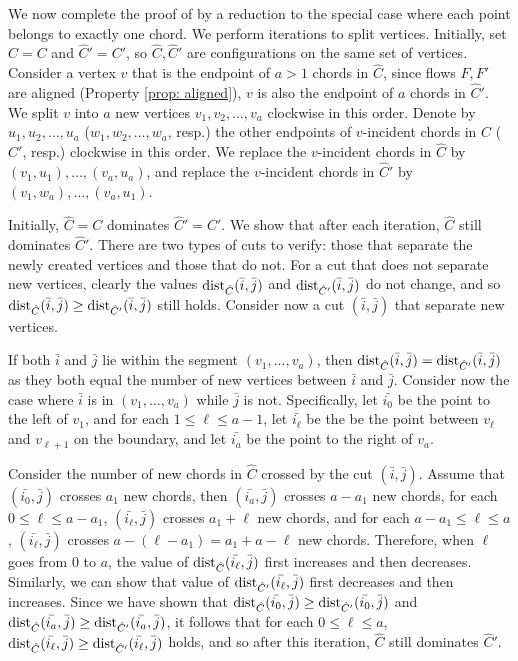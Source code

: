 \documentclass[11pt]{article}
\newcommand{\dist}{\textnormal{dist}}
\begin{document}
We now complete the proof of  by a reduction to the special case where each point belongs to exactly one chord. We perform iterations to split vertices.
Initially, set $\hat C=C$ and $\hat C'=C'$, so $\hat C, \hat C'$ are configurations on the same set of vertices.
Consider a vertex $v$ that is the endpoint of $a>1$ chords in $\hat C$, since flows $F,F'$ are aligned (Property \ref{prop: aligned}), $v$ is also the endpoint of $a$ chords in $\hat C'$.
We split $v$ into $a$ new vertices $v_1,v_2,\ldots, v_a$ clockwise in this order. 
Denote by $u_1,u_2,\ldots,u_a$ ($w_1,w_2,\ldots,w_a$, resp.) 
the other endpoints of $v$-incident chords in $\hat C$ ($\hat C'$, resp.) clockwise in this order. 
We replace the $v$-incident chords in $\hat C$ by $(v_1,u_1),\dots,(v_a,u_a)$, and replace the $v$-incident chords in $\hat C'$ by $(v_1,w_a),\dots,(v_a,u_1)$. 

Initially, $\hat C=C$ dominates $\hat C'=C'$.
We show that after each iteration, $\hat C$ still dominates $\hat C'$. 
There are two types of cuts to verify: those that separate the newly created vertices and those that do not.
For a cut that does not separate new vertices, clearly the values $\dist_{\hat C}(\bar i,\bar j)$ and $\dist_{\hat C'}(\bar i,\bar j)$ do not change, and so $\dist_{\hat C}(\bar i,\bar j)\ge \dist_{\hat C'}(\bar i,\bar j)$ still holds.
Consider now a cut $(\bar i,\bar j)$ that separate new vertices.

If both $\bar i$ and $\bar j$ lie within the segment $(v_1,\ldots,v_a)$, then $\dist_{\hat C}(\bar{i},\bar{j})=\dist_{\hat C'}(\bar{i},\bar{j})$ as they both equal the number of new vertices between $\bar{i}$ and $\bar{j}$. Consider now the case where $\bar i$ is in $(v_1,\ldots,v_a)$ while $\bar j$ is not. Specifically, let $\bar{i_0}$ be the point to the left of $v_1$, and for each $1 \le \ell \le a-1$, let $\bar{i_{\ell}}$ be the be the point between $v_{\ell}$ and $v_{\ell+1}$ on the boundary, and let $\bar{i_a}$ be the point to the right of $v_a$. 

Consider the number of new chords in $\hat C$ crossed by the cut $(\bar i,\bar j)$.
Assume that $(\bar{i_{0}},\bar{j})$ crosses $a_1$ new chords, then $(\bar{i_{a}},\bar{j})$ crosses $a-a_1$ new chords, for each $0 \le \ell \le a-a_1$, $(\bar{i_{\ell}},\bar{j})$ crosses $a_1+\ell$ new chords, and for each $a-a_1 \le \ell \le a$, $(\bar{i_{\ell}},\bar{j})$ crosses $a-(\ell-a_1)=a_1+a-\ell$ new chords. 
Therefore, when $\ell$ goes from $0$ to $a$, the value of $\dist_{\hat C}(\bar{i_{\ell}},\bar{j})$ first increases and then decreases. 
Similarly, we can show that value of $\dist_{\hat C'}(\bar{i_{\ell}},\bar{j})$ first decreases and then increases. Since we have shown that $\dist_{\hat C}(\bar{i_{0}},\bar{j}) \ge \dist_{\hat C'}(\bar{i_{0}},\bar{j})$ and $\dist_{\hat C}(\bar{i_{a}},\bar{j}) \ge \dist_{\hat C'}(\bar{i_{a}},\bar{j})$, it follows that for each $0 \le \ell \le a$, $\dist_{\hat C}(\bar{i_{\ell}},\bar{j}) \ge \dist_{\hat C'}(\bar{i_{\ell}},\bar{j})$ holds, and so after this iteration, $\hat C$ still dominates $\hat C'$.
\end{document}
